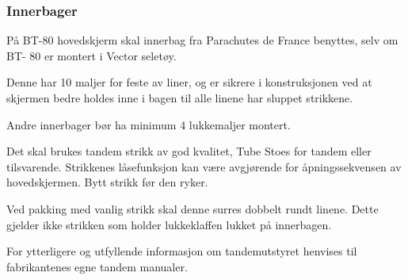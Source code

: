 \subsubsection{Innerbager}
På BT-80 hovedskjerm skal innerbag fra Parachutes de France benyttes, selv om BT- 80 er montert i Vector seletøy.

Denne har 10 maljer for feste av liner, og er sikrere i konstruksjonen ved at skjermen bedre holdes inne i bagen til alle linene har sluppet strikkene.

Andre innerbager bør ha minimum 4 lukkemaljer montert.

Det skal brukes tandem strikk av god kvalitet, Tube Stoes for tandem eller tilsvarende. Strikkenes låsefunksjon kan være avgjørende for åpningssekvensen av hovedskjermen. Bytt strikk før den ryker.

Ved pakking med vanlig strikk skal denne surres dobbelt rundt linene. Dette gjelder ikke strikken som holder lukkeklaffen lukket på innerbagen.

For ytterligere og utfyllende informasjon om tandemutstyret henvises til fabrikantenes egne tandem manualer.
